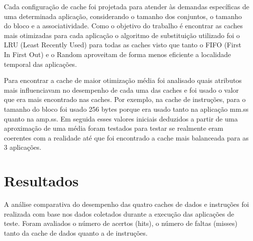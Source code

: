 \documentclass[12pt]{article}
\begin{document}
Cada configuração de cache foi projetada para atender às demandas específicas de uma determinada aplicação, considerando o tamanho dos conjuntos, o tamanho do bloco e a associatividade. Como o objetivo do trabalho é encontrar as caches mais otimizadas para cada aplicação o algoritmo de substituição utilizado foi o LRU (Least Recently Used) para todas as caches visto que tanto o FIFO (First In First Out) e o Random aproveitam de forma menos eficiente a localidade temporal das aplicações.

Para encontrar a cache de maior otimização média foi analisado quais atributos mais influenciavam no desempenho de cada uma das caches e foi usado o valor que era mais encontrado nas caches. Por exemplo, na cache de instruções, para o tamanho do bloco foi usado 256 bytes porque era usado tanto na aplicação mm.ss quanto na amp.ss. Em seguida esses valores iniciais deduzidos a partir de uma aproximação de uma média foram testados para testar se realmente eram  coerentes com a realidade até que foi encontrado a cache mais balanceada para as 3 aplicações.


\section{Resultados} \label{sec:resultados}
A análise comparativa do desempenho das quatro caches de dados e instruções foi realizada com base nos dados coletados durante a execução das aplicações de teste. Foram avaliados o número de acertos (hits), o número de faltas (misses) tanto da cache de dados quanto a de instruções.
\end{document}
